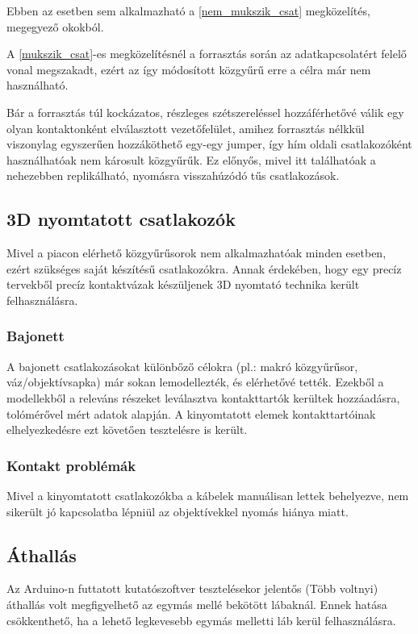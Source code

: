 Ebben az esetben sem alkalmazható a \ref{nem_mukszik_csat} megközelítés, megegyező okokból.

A \ref{mukszik_csat}-es megközelítésnél a forrasztás során az adatkapcsolatért felelő vonal megszakadt, ezért az így módosított közgyűrű erre a célra már nem használható.

Bár a forrasztás túl kockázatos, részleges szétszereléssel hozzáférhetővé válik egy olyan kontaktonként elválasztott vezetőfelület, amihez forrasztás nélkkül viszonylag egyszerűen hozzáköthető egy-egy jumper, így hím oldali csatlakozóként használhatóak nem károsult közgyűrűk.
Ez előnyős, mivel itt találhatóak a nehezebben replikálható, nyomásra visszahúzódó tűs csatlakozások.
\subsection{3D nyomtatott csatlakozók}
Mivel a piacon elérhető közgyűrűsorok nem alkalmazhatóak minden esetben, ezért szükséges saját készítésű csatlakozókra.
Annak érdekében, hogy egy precíz tervekből precíz kontaktvázak készüljenek 3D nyomtató technika került felhasználásra.
\subsubsection{Bajonett}
\label{bajonett_mero}
A bajonett csatlakozásokat különbőző célokra (pl.: makró közgyűrűsor, váz/objektívsapka) már sokan lemodellezték, és elérhetővé tették.
Ezekből a modellekből a releváns részeket leválasztva kontakttartók kerültek hozzáadásra, tolómérővel mért adatok alapján.
A kinyomtatott elemek kontakttartóinak elhelyezkedésre ezt követően tesztelésre is került.

\subsubsection{Kontakt problémák}
Mivel a kinyomtatott csatlakozókba a kábelek manuálisan lettek behelyezve, nem sikerült jó kapcsolatba lépniül az objektívekkel nyomás hiánya miatt.

\subsection{Áthallás}
Az Arduino-n futtatott kutatószoftver tesztelésekor jelentős (Több voltnyi) áthallás volt megfigyelhető az egymás mellé bekötött lábaknál.
Ennek hatása csökkenthető, ha a lehető legkevesebb egymás melletti láb kerül felhasználásra.